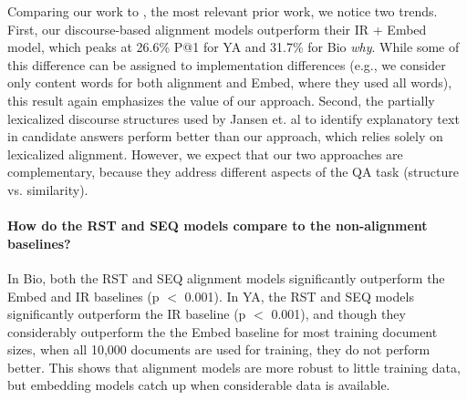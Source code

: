 Comparing our work to \citet{jansen14}, the most relevant prior work, we notice two trends.
First, our discourse-based alignment models outperform their IR + Embed model, which peaks at 26.6\% P@1 for YA and 31.7\% for Bio \emph{why}. While some of this difference can be assigned to implementation differences (e.g., we consider only content words for both alignment and Embed, where they used all words), this result again emphasizes the value of our approach.
Second, the partially lexicalized discourse structures used by Jansen et. al to identify explanatory text in candidate answers perform better than our approach, which relies solely on lexicalized alignment. However, we expect that our two approaches are complementary, because they address different aspects of the QA task (structure vs. similarity).

\paragraph{How do the RST and SEQ models compare to the non-alignment baselines?}


In Bio, both the RST and SEQ alignment models significantly outperform the Embed and IR baselines (p $<$ 0.001).  %
In YA, the RST and SEQ models significantly outperform the IR baseline (p $<$ 0.001), and though 
they considerably outperform the the Embed baseline for most training document sizes, when all 10,000 documents are used for training, they do not perform  better.  
This shows that alignment models are more robust to little training data, but embedding models catch up when considerable data is available.

